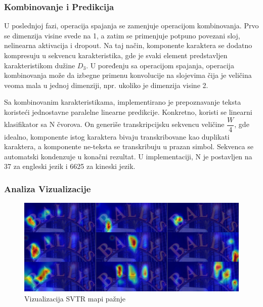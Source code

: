 \documentclass[a4paper,12pt]{article}
\begin{document}
	\subsubsection{Kombinovanje i Predikcija}
	U poslednjoj fazi, operacija spajanja se zamenjuje operacijom kombinovanja. Prvo se dimenzija visine svede na 1, a zatim se primenjuje potpuno povezani sloj, nelinearna aktivacija i dropout. Na taj način, komponente karaktera se dodatno kompresuju u sekvencu karakteristika, gde je svaki element predstavljen karakteristikom dužine \(D_3\). U poređenju sa operacijom spajanja, operacija kombinovanja može da izbegne primenu konvolucije na slojevima čija je veličina veoma mala u jednoj dimenziji, npr. ukoliko je dimenzija visine 2.
	
	Sa kombinovanim karakteristikama, implementirano je prepoznavanje teksta koristeći jednostavne paralelne linearne predikcije. Konkretno, koristi se linearni klasifikator sa N čvorova. On generiše transkripcijsku sekvencu veličine \(\dfrac{W}{4}\), gde idealno, komponente istog karaktera bivaju transkribovane kao duplikati karaktera, a komponente ne-teksta se transkribuju u prazan simbol. Sekvenca se automatski kondenzuje u konačni rezultat. U implementaciji, N je postavljen na 37 za engleski jezik i 6625 za kineski jezik.
	
	\subsubsection{Analiza Vizualizacije}
	\begin{figure}[H]
		\centering
		\includegraphics[width=\textwidth]{assets/visualization-of-svtr-attention-maps.png}
		\caption{Vizualizacija SVTR mapi pažnje}
		\label{fig:visualization-of-svtr-attention-maps}
	\end{figure}
	
\end{document}
